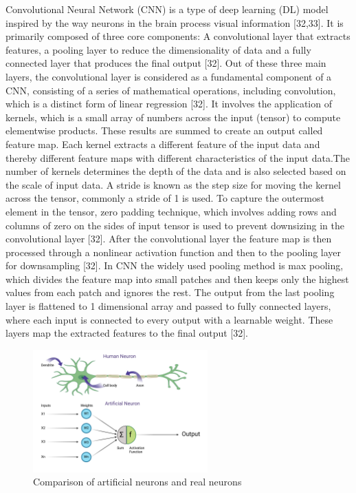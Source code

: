 \documentclass[12pt,a4paper]{report}
\begin{document}
Convolutional Neural Network (CNN) is a type of deep learning (DL) model inspired by the way neurons in the brain process visual information [32,33]. It is primarily composed of three core components: A convolutional layer that extracts features, a pooling layer to reduce the 
dimensionality of data and a fully connected layer that produces the final output [32]. Out of these three main layers, the convolutional layer is considered as a fundamental component of a CNN, consisting of a series of mathematical operations, including convolution, which is 
a distinct form of linear regression [32]. It involves the application of kernels, which is a small array of numbers across the input (tensor) to compute elementwise products. These results are summed to create an output called feature map. Each kernel extracts a different feature 
of the input data and thereby different feature maps with different characteristics of the input data.The number of kernels determines the depth of the data and is also selected based on the scale of input data. A stride is known as the step size for moving the kernel across the tensor, 
commonly a stride of 1 is used. To capture the outermost element in the tensor, zero padding technique, which involves adding rows and columns of zero on the sides of input tensor is used to prevent downsizing in the convolutional layer [32]. After the convolutional layer the feature map 
is then processed through a nonlinear activation function and then to the pooling layer for downsampling [32]. In CNN the widely used pooling method is max pooling, which divides the feature map into small patches and then keeps only the highest values from each patch and ignores the rest. 
The output from the last pooling layer is flattened to 1 dimensional array and passed to fully connected layers, where each input is connected to every output with a learnable weight. These layers map the extracted features to the final output [32]. \\

\begin{figure}[h]
    \centering
    \includegraphics[width=0.6\textwidth]{images/neuron.png}
    \caption{Comparison of artificial neurons and real neurons}
    \label{Figure 4}
\end{figure}
\end{document}
